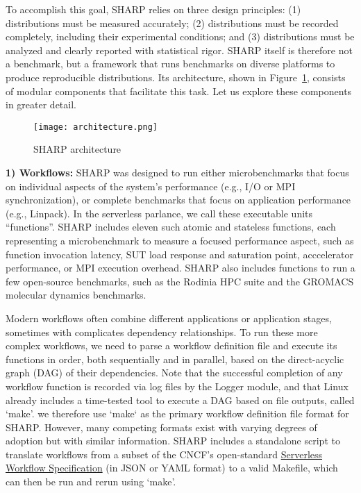 \documentclass[11pt]{article}
\begin{document}
To accomplish this goal, SHARP relies on three design principles: (1) distributions must be measured accurately; (2) distributions must be recorded completely, including their experimental conditions; and (3) distributions must be analyzed and clearly reported with statistical rigor.
SHARP itself is therefore not a benchmark, but a framework that runs benchmarks on diverse platforms to produce reproducible distributions.
Its architecture, shown in Figure~\ref{fig:architecture}, consists of modular components that facilitate this task.
Let us explore these components in greater detail.

\begin{figure}[ht]
\begin{center}
\texttt{[image: architecture.png]}
\caption{SHARP architecture}

\label{fig:architecture}
\end{center}
\end{figure}

\textbf{1) Workflows:}
SHARP was designed to run either microbenchmarks that focus on individual aspects of the system's performance (e.g., I/O or MPI synchronization), or complete benchmarks that focus on application performance (e.g., Linpack).
In the serverless parlance, we call these executable units ``functions''.
SHARP includes eleven such atomic and stateless functions, each representing a microbenchmark to measure a focused performance aspect, such as function invocation latency, SUT load response and saturation point, acccelerator performance, or MPI execution overhead. 
SHARP also includes functions to run a few open-source benchmarks, such as the Rodinia HPC suite and the GROMACS molecular dynamics benchmarks.

Modern workflows often combine different applications or application stages, sometimes with complicates dependency relationships.
To run these more complex workflows, we need to parse a workflow definition file and  execute its functions in order, both sequentially and in parallel, based on the direct-acyclic graph (DAG) of their dependencies.
Note that the successful completion of any workflow function is recorded via log files by the Logger module, and that Linux already includes a time-tested tool to execute a DAG based on file outputs, called `make'.
we therefore use `make` as the primary workflow definition file format for SHARP.
However, many competing formats exist with varying degrees of adoption but with similar information.
SHARP includes a standalone script to translate workflows from
a subset of the CNCF's open-standard \href{https://serverlessworkflow.github.io/}{Serverless Workflow Specification} (in JSON or YAML format) to a valid Makefile, which can then be run and rerun using `make'.
\end{document}
